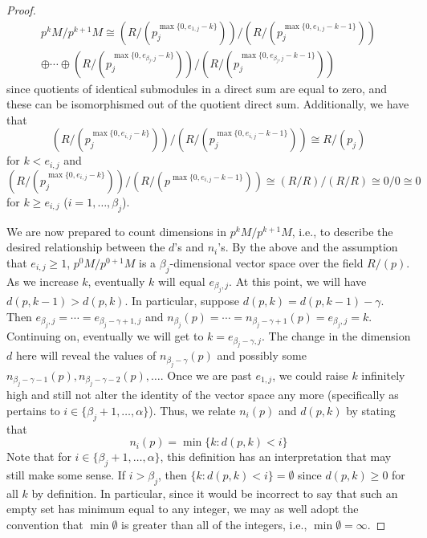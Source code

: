 \documentclass[../psets.tex]{subfiles}
\begin{document}
\begin{enumerate}
\begin{enumerate}
\begin{proof}
\begin{multline*}
                p^kM/p^{k+1}M \cong (R/(p_j^{\max\{0,e_{1,j}-k\}}))/(R/(p_j^{\max\{0,e_{1,j}-k-1\}}))\\
                \oplus\cdots\oplus(R/(p_j^{\max\{0,e_{\beta_j,j}-k\}}))/(R/(p_j^{\max\{0,e_{\beta_j,j}-k-1\}}))
            \end{multline*}
            since quotients of identical submodules in a direct sum are equal to zero, and these can be isomorphismed out of the quotient direct sum. Additionally, we have that
            \begin{equation*}
                (R/(p_j^{\max\{0,e_{i,j}-k\}}))/(R/(p_j^{\max\{0,e_{i,j}-k-1\}})) \cong R/(p_j)
            \end{equation*}
            for $k<e_{i,j}$ and
            \begin{equation*}
                (R/(p_j^{\max\{0,e_{i,j}-k\}}))/(R/(p^{\max\{0,e_{i,j}-k-1\}})) \cong (R/R)/(R/R)
                \cong 0/0
                \cong 0
            \end{equation*}
            for $k\geq e_{i,j}$ ($i=1,\dots,\beta_j$).\par
            We are now prepared to count dimensions in $p^kM/p^{k+1}M$, i.e., to describe the desired relationship between the $d$'s and $n_i$'s. By the above and the assumption that $e_{i,j}\geq 1$, $p^0M/p^{0+1}M$ is a $\beta_j$-dimensional vector space over the field $R/(p)$. As we increase $k$, eventually $k$ will equal $e_{\beta_j,j}$. At this point, we will have $d(p,k-1)>d(p,k)$. In particular, suppose $d(p,k)=d(p,k-1)-\gamma$. Then $e_{\beta_j,j}=\cdots=e_{\beta_j-\gamma+1,j}$ and $n_{\beta_j}(p)=\cdots=n_{\beta_j-\gamma+1}(p)=e_{\beta_j,j}=k$. Continuing on, eventually we will get to $k=e_{\beta_j-\gamma,j}$. The change in the dimension $d$ here will reveal the values of $n_{\beta_j-\gamma}(p)$ and possibly some $n_{\beta_j-\gamma-1}(p),n_{\beta_j-\gamma-2}(p),\dots$. Once we are past $e_{1,j}$, we could raise $k$ infinitely high and still not alter the identity of the vector space any more (specifically as pertains to $i\in\{\beta_j+1,\dots,\alpha\}$). Thus, we relate $n_i(p)$ and $d(p,k)$ by stating that
            \begin{equation*}
                \boxed{n_i(p) = \min\{k:d(p,k)<i\}}
            \end{equation*}
            Note that for $i\in\{\beta_j+1,\dots,\alpha\}$, this definition has an interpretation that may still make some sense. If $i>\beta_j$, then $\{k:d(p,k)<i\}=\emptyset$ since $d(p,k)\geq 0$ for all $k$ by definition. In particular, since it would be incorrect to say that such an empty set has minimum equal to any integer, we may as well adopt the convention that $\min\emptyset$ is greater than all of the integers, i.e., $\min\emptyset=\infty$.\par\smallskip

\end{proof}
\end{enumerate}
\end{enumerate}
\end{document}
